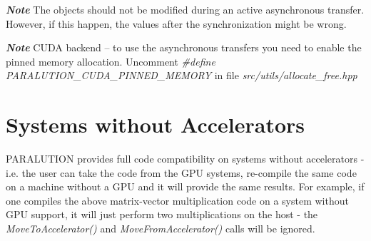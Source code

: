 

\textbf{\emph{Note}} The objects should not be modified during an active asynchronous transfer. However, if this happen, the values after the synchronization might be wrong.

\textbf{\emph{Note}} CUDA backend -- to use the asynchronous transfers you need to enable the pinned memory allocation. Uncomment \emph{\#define PARALUTION\_CUDA\_PINNED\_MEMORY} in file \emph{src/utils/allocate\_free.hpp}

\section{Systems without Accelerators}

PARALUTION provides full code compatibility on systems without accelerators - i.e. the user can take the code from the GPU systems, re-compile the same code on a machine without a GPU and it will provide the same results. For example, if one compiles the above matrix-vector multiplication code on a system without GPU support, it will just perform two multiplications on the host - the \emph{MoveToAccelerator()} and \emph{MoveFromAccelerator()} calls will be ignored.

